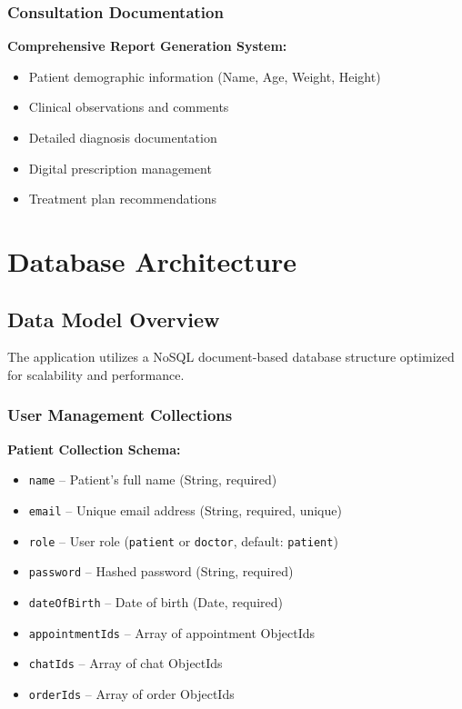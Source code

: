 \documentclass[12pt]{article}
\begin{document}
\subsubsection{Consultation Documentation}
\textbf{Comprehensive Report Generation System:}
\begin{itemize}[leftmargin=1cm]
    \item Patient demographic information (Name, Age, Weight, Height)
    \item Clinical observations and comments
    \item Detailed diagnosis documentation
    \item Digital prescription management
    \item Treatment plan recommendations
\end{itemize}

\section{Database Architecture}

\subsection{Data Model Overview}
The application utilizes a NoSQL document-based database structure optimized for scalability and performance.

\subsubsection{User Management Collections}

\textbf{Patient Collection Schema:}
\begin{itemize}[leftmargin=1cm]
    \item \texttt{name} -- Patient's full name (String, required)
    \item \texttt{email} -- Unique email address (String, required, unique)
    \item \texttt{role} -- User role (\texttt{patient} or \texttt{doctor}, default: \texttt{patient})
    \item \texttt{password} -- Hashed password (String, required)
    \item \texttt{dateOfBirth} -- Date of birth (Date, required)
    \item \texttt{appointmentIds} -- Array of appointment ObjectIds
    \item \texttt{chatIds} -- Array of chat ObjectIds
    \item \texttt{orderIds} -- Array of order ObjectIds
\end{itemize}
\end{document}
